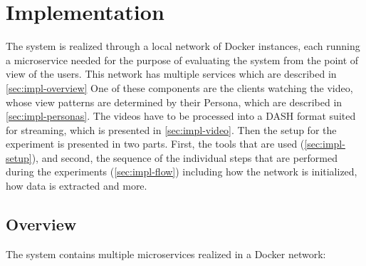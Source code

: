 \chapter{Implementation}
\label{cha:implementation}

The system is realized through a local network of Docker instances, each running a microservice needed for the purpose of evaluating the system from the point of view of the users. This network has multiple services which are described in \autoref{sec:impl-overview}
One of these components are the clients watching the video, whose view patterns are determined by their Persona, which are described in \autoref{sec:impl-personas}.
The videos have to be processed into a \ac{DASH} format suited for streaming, which is presented in \autoref{sec:impl-video}.
Then the setup for the experiment is presented in two parts. First, the tools that are used (\autoref{sec:impl-setup}), and second, the sequence of the individual steps that are performed during the experiments (\autoref{sec:impl-flow}) including how the network is initialized, how data is extracted and more.

\section{Overview}
\label{sec:impl-overview}
The system  contains multiple microservices realized in a Docker network:

